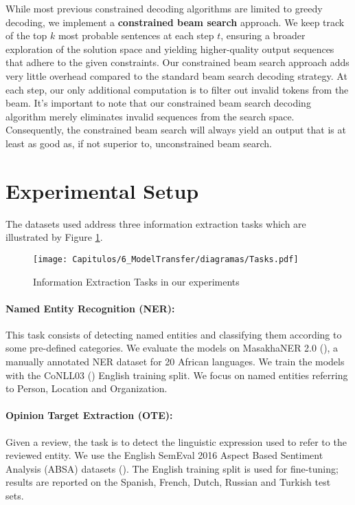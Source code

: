 While most previous constrained decoding algorithms are limited to greedy decoding, we implement a \textbf{constrained beam search} approach. We keep track of the top \(k\) most probable sentences at each step \(t\), ensuring a broader exploration of the solution space and yielding higher-quality output sequences that adhere to the given constraints. Our constrained beam search approach adds very little overhead compared to the standard beam search decoding strategy. At each step, our only additional computation is to filter out invalid tokens from the beam. It's important to note that our constrained beam search decoding algorithm merely eliminates invalid sequences from the search space. Consequently, the constrained beam search will always yield an output that is at least as good as, if not superior to, unconstrained beam search.


\section{Experimental Setup}

The datasets used address three information extraction tasks which are illustrated by Figure \ref{fig6:tasks}.
\begin{figure}[htb]
    \centering
    \texttt{[image: Capitulos/6\_ModelTransfer/diagramas/Tasks.pdf]}
    \caption{Information Extraction Tasks in our experiments}
    \label{fig6:tasks}
\end{figure}

\paragraph{Named Entity Recognition (NER):} This task consists of detecting
named entities and classifying them according to some pre-defined categories. We evaluate the models on MasakhaNER 2.0 (\cite{adelani-etal-2022-masakhaner}), a manually annotated NER dataset for 20 African languages. We train the models with the CoNLL03 (\cite{DBLP:conf/conll/SangM03}) English training split. We focus on named entities referring to Person, Location and Organization.

\paragraph{Opinion Target Extraction (OTE):} Given a review, the task is to detect the linguistic expression used to refer to the reviewed entity. We use the
English SemEval 2016 Aspect Based Sentiment Analysis (ABSA) datasets
(\cite{pontiki-etal-2016-semeval}). The English training split is used for fine-tuning; results are reported on the Spanish, French, Dutch, Russian and Turkish test sets.

